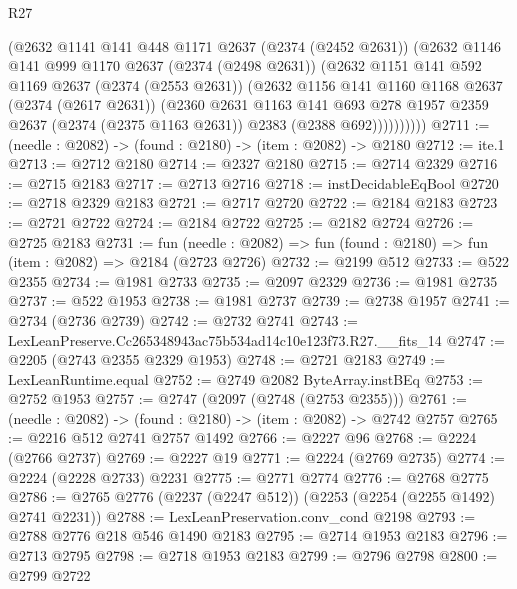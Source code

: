 \begin{lexlean}{R27}
\begin{coremodule}
            (@2632
              @1141
              @141
              @448
              @1171
              @2637
              (@2374 (@2452 @2631))
              (@2632
                @1146
                @141
                @999
                @1170
                @2637
                (@2374 (@2498 @2631))
                (@2632
                  @1151
                  @141
                  @592
                  @1169
                  @2637
                  (@2374 (@2553 @2631))
                  (@2632
                    @1156
                    @141
                    @1160
                    @1168
                    @2637
                    (@2374 (@2617 @2631))
                    (@2360
                      @2631
                      @1163
                      @141
                      @693
                      @278
                      @1957
                      @2359
                      @2637
                      (@2374 (@2375 @1163 @2631))
                      @2383
                      (@2388 @692))))))))))
@2711 := (needle : @2082) -> (found : @2180) -> (item : @2082) -> @2180
@2712 := ite.{1}
@2713 := @2712 @2180
@2714 := @2327 @2180
@2715 := @2714 @2329
@2716 := @2715 @2183
@2717 := @2713 @2716
@2718 := instDecidableEqBool
@2720 := @2718 @2329 @2183
@2721 := @2717 @2720
@2722 := @2184 @2183
@2723 := @2721 @2722
@2724 := @2184 @2722
@2725 := @2182 @2724
@2726 := @2725 @2183
@2731 := fun (needle : @2082) => fun (found : @2180) => fun (item : @2082) => @2184 (@2723 @2726)
@2732 := @2199 @512
@2733 := @522 @2355
@2734 := @1981 @2733
@2735 := @2097 @2329
@2736 := @1981 @2735
@2737 := @522 @1953
@2738 := @1981 @2737
@2739 := @2738 @1957
@2741 := @2734 (@2736 @2739)
@2742 := @2732 @2741
@2743 := LexLeanPreserve.Cc265348943ac75b534ad14c10e123f73.R27.__fits_14
@2747 := @2205 (@2743 @2355 @2329 @1953)
@2748 := @2721 @2183
@2749 := LexLeanRuntime.equal
@2752 := @2749 @2082 ByteArray.instBEq
@2753 := @2752 @1953
@2757 := @2747 (@2097 (@2748 (@2753 @2355)))
@2761 := (needle : @2082) -> (found : @2180) -> (item : @2082) -> @2742 @2757
@2765 := @2216 @512 @2741 @2757 @1492
@2766 := @2227 @96
@2768 := @2224 (@2766 @2737)
@2769 := @2227 @19
@2771 := @2224 (@2769 @2735)
@2774 := @2224 (@2228 @2733) @2231
@2775 := @2771 @2774
@2776 := @2768 @2775
@2786 := @2765 @2776 (@2237 (@2247 @512)) (@2253 (@2254 (@2255 @1492) @2741 @2231))
@2788 := LexLeanPreservation.conv_cond @2198
@2793 := @2788 @2776 @218 @546 @1490 @2183
@2795 := @2714 @1953 @2183
@2796 := @2713 @2795
@2798 := @2718 @1953 @2183
@2799 := @2796 @2798
@2800 := @2799 @2722

\end{coremodule}
\end{lexlean}
